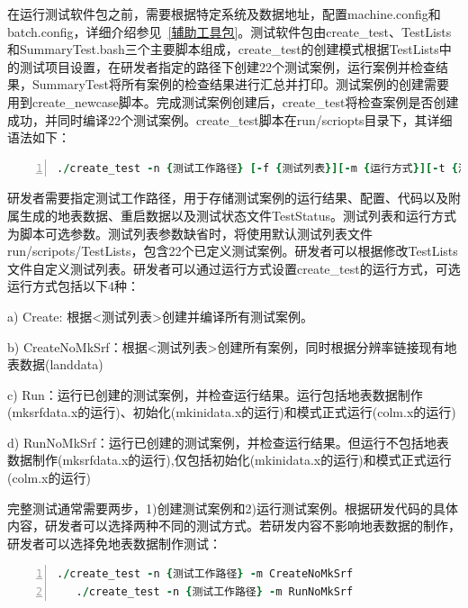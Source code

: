 在运行测试软件包之前，需要根据特定系统及数据地址，配置machine.config和batch.config，详细介绍参见~\ref{辅助工具包}。测试软件包由create\_test、TestLists和SummaryTest.bash三个主要脚本组成，create\_test的创建模式根据TestLists中的测试项目设置，在研发者指定的路径下创建22个测试案例，运行案例并检查结果，SummaryTest将所有案例的检查结果进行汇总并打印。测试案例的创建需要用到create\_newcase脚本。完成测试案例创建后，create\_test将检查案例是否创建成功，并同时编译22个测试案例。create\_test脚本在run/scriopts目录下，其详细语法如下：

\begin{lstlisting}[language=fortran, basicstyle=\linespread{1.0}\footnotesize\ttfamily, commentstyle=\color{olive}, numbers=left, numberstyle=\tiny, xleftmargin=1.5em,xrightmargin=0em, aboveskip=1em]
   ./create_test -n {测试工作路径} [-f {测试列表}][-m {运行方式}][-t {测试类型} [-r {重启时间}]]
\end{lstlisting}

研发者需要指定{测试工作路径}，用于存储测试案例的运行结果、配置、代码以及附属生成的地表数据、重启数据以及测试状态文件TestStatus。{测试列表}和{运行方式}为脚本可选参数。{测试列表}参数缺省时，将使用默认测试列表文件run/scripots/TestLists，包含22个已定义测试案例。研发者可以根据修改TestLists文件自定义测试列表。研发者可以通过{运行方式}设置create\_test的运行方式，可选{运行方式}包括以下4种：

a) Create: 根据<测试列表>创建并编译所有测试案例。

b) CreateNoMkSrf：根据<测试列表>创建所有案例，同时根据分辨率链接现有地表数据(landdata)

c) Run：运行已创建的测试案例，并检查运行结果。运行包括地表数据制作(mksrfdata.x的运行)、初始化(mkinidata.x的运行)和模式正式运行(colm.x的运行)

d) RunNoMkSrf：运行已创建的测试案例，并检查运行结果。但运行不包括地表数据制作(mksrfdata.x的运行),仅包括初始化(mkinidata.x的运行)和模式正式运行(colm.x的运行)

完整测试通常需要两步，1)创建测试案例和2)运行测试案例。根据研发代码的具体内容，研发者可以选择两种不同的测试方式。若研发内容不影响地表数据的制作，研发者可以选择免地表数据制作测试：

\begin{lstlisting}[language=fortran, basicstyle=\linespread{1.0}\footnotesize\ttfamily, commentstyle=\color{olive}, numbers=left, numberstyle=\tiny, xleftmargin=1.5em,xrightmargin=0em, aboveskip=1em]
   ./create_test -n {测试工作路径} -m CreateNoMkSrf
   ./create_test -n {测试工作路径} -m RunNoMkSrf
\end{lstlisting}

